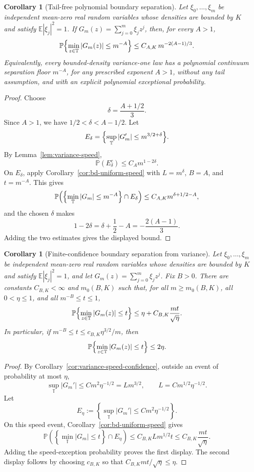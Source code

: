 \documentclass[11pt]{amsart}
\numberwithin{equation}{section}
\newtheorem{corollary}[theorem]{Corollary}
\theoremstyle{definition}
\theoremstyle{remark}
\newcommand{\T}{\mathbb T}
\newcommand{\Prob}{\mathbb P}
\newcommand{\Exp}{\mathbb E}
\newcommand{\abs}[1]{\left\lvert #1\right\rvert}
\begin{document}
\begin{corollary}[Tail-free polynomial boundary separation]
\label{cor:variance-boundary-separation}
Let \(\xi_0,\ldots,\xi_m\) be independent mean-zero real random variables whose
densities are bounded by \(K\) and satisfy \(\Exp|\xi_j|^2=1\).  If
\(G_m(z)=\sum_{j=0}^m\xi_jz^j\), then, for every \(A>1\),
\[
  \Prob\Bigl\{\min_{z\in\T}\abs{G_m(z)}\le m^{-A}\Bigr\}
  \le C_{A,K}\,m^{-2(A-1)/3}.
\]
Equivalently, every bounded-density variance-one law has a polynomial
continuum separation floor \(m^{-A}\), for any prescribed exponent \(A>1\),
without any tail assumption, and with an explicit polynomial exceptional
probability.
\end{corollary}

\begin{proof}
Choose
\[
  \delta=\frac{A+1/2}{3}.
\]
Since \(A>1\), we have \(1/2<\delta<A-1/2\).  Let
\[
  E_\delta=\Bigl\{\sup_{\T}\abs{G_m'}\le m^{3/2+\delta}\Bigr\}.
\]
By Lemma~\ref{lem:variance-speed},
\[
  \Prob(E_\delta^c)\le C_A m^{1-2\delta}.
\]
On
\(E_\delta\), apply Corollary~\ref{cor:bd-uniform-speed} with
\(L=m^\delta\), \(B=A\), and \(t=m^{-A}\).  This gives
\[
  \Prob\Bigl(
    \Bigl\{\min_{\T}\abs{G_m}\le m^{-A}\Bigr\}\cap E_\delta
  \Bigr)
  \le C_{A,K}m^{\delta+1/2-A},
\]
and the chosen \(\delta\) makes
\[
  1-2\delta=\delta+\frac12-A=-\frac{2(A-1)}{3}.
\]
Adding the two estimates gives the displayed bound.
\end{proof}

\begin{corollary}[Finite-confidence boundary separation from variance]
\label{cor:variance-boundary-confidence}
Let \(\xi_0,\ldots,\xi_m\) be independent mean-zero real random variables whose
densities are bounded by \(K\) and satisfy \(\Exp|\xi_j|^2=1\), and let
\(G_m(z)=\sum_{j=0}^m\xi_jz^j\).  Fix \(B>0\).  There are constants
\(C_{B,K}<\infty\) and \(m_0(B,K)\) such that, for all \(m\ge m_0(B,K)\),
all \(0<\eta\le1\), and all \(m^{-B}\le t\le1\),
\[
  \Prob\Bigl\{\min_{z\in\T}\abs{G_m(z)}\le t\Bigr\}
  \le
  \eta+C_{B,K}\frac{mt}{\sqrt\eta}.
\]
In particular, if \(m^{-B}\le t\le c_{B,K}\eta^{3/2}/m\), then
\[
  \Prob\Bigl\{\min_{z\in\T}\abs{G_m(z)}\le t\Bigr\}\le2\eta .
\]
\end{corollary}

\begin{proof}
By Corollary~\ref{cor:variance-speed-confidence}, outside an event of
probability at most \(\eta\),
\[
  \sup_{\T}|G_m'|\le C m^2\eta^{-1/2}
  =
  Lm^{3/2},
  \qquad
  L=Cm^{1/2}\eta^{-1/2}.
\]
Let
\[
  E_\eta:=\left\{\sup_{\T}|G_m'|\le C m^2\eta^{-1/2}\right\}.
\]
On this speed event, Corollary~\ref{cor:bd-uniform-speed} gives
\[
  \Prob\left(\left\{\min_{\T}\abs{G_m}\le t\right\}\cap E_\eta\right)
  \le C_{B,K}Lm^{1/2}t
  \le C_{B,K}\frac{mt}{\sqrt\eta}.
\]
Adding the speed-exception probability proves the first display.  The second
display follows by choosing \(c_{B,K}\) so that
\(C_{B,K}mt/\sqrt\eta\le\eta\).
\end{proof}
\end{document}
